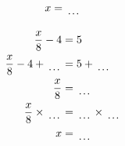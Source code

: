 \documentclass[12pt]{article}
\newcounter{minipagecount}
\begin{document}
\begin{multicols}{2}
\begin{minipage}[t]{0.45\textwidth}
\begin{align*}
        x &= \dotuline{\hspace{5mm}}\\
    \end{align*}
\end{minipage}\columnbreak
\noindent{(\theminipagecount)}\hspace{0.1mm} %
\begin{minipage}[t]{0.45\textwidth} %
    \vspace{-26pt}  %
    \raggedright %
    \begin{align*} %
        \frac{x}{8} - 4 &= 5\\
        \frac{x}{8} - 4 + \dotuline{\hspace{5mm}} &= 5 + \dotuline{\hspace{5mm}}\\
        \frac{x}{8} &= \dotuline{\hspace{5mm}}\\
        \frac{x}{8} \times\dotuline{\hspace{5mm}} &= \dotuline{\hspace{5mm}} \times\dotuline{\hspace{5mm}}\\
        x &= \dotuline{\hspace{5mm}}\\
    \end{align*}
\end{minipage} %
\noindent{(\theminipagecount)}\hspace{0.1mm} %
\begin{minipage}[t]{0.45\textwidth} %
    \vspace{-26pt}  %

\end{minipage}
\end{multicols}
\end{document}
